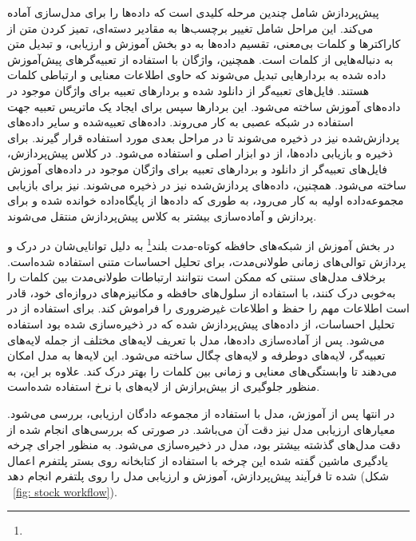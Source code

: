 پیش‌پردازش شامل چندین مرحله کلیدی است که داده‌ها را برای مدل‌سازی آماده می‌کند. این مراحل شامل تغییر برچسب‌ها به مقادیر دسته‌ای، تمیز کردن متن از کاراکترها و کلمات بی‌معنی، تقسیم داده‌ها به دو بخش آموزش و ارزیابی، و تبدیل متن به دنباله‌هایی از کلمات است. همچنین، واژگان با استفاده از تعبیه‌گرهای پیش‌آموزش داده شده  به بردارهایی تبدیل می‌شوند که حاوی اطلاعات معنایی و ارتباطی کلمات هستند. فایل‌های تعبیه‌گر  از  دانلود شده و بردارهای تعبیه برای واژگان موجود در داده‌های آموزش ساخته می‌شود. این بردارها سپس برای ایجاد یک ماتریس تعبیه جهت استفاده در شبکه عصبی به کار می‌روند. داده‌های تعبیه‌شده و سایر داده‌های پردازش‌شده نیز در  ذخیره می‌شوند تا در مراحل بعدی مورد استفاده قرار گیرند. برای ذخیره و بازیابی داده‌ها، از دو ابزار اصلی  و  استفاده می‌شود. در کلاس پیش‌پردازش، فایل‌های تعبیه‌گر  از  دانلود و بردارهای تعبیه برای واژگان موجود در داده‌های آموزش ساخته می‌شود. همچنین، داده‌های پردازش‌شده نیز در  ذخیره می‌شوند.  نیز برای بازیابی مجموعه‌داده اولیه به کار می‌رود، به طوری که داده‌ها از پایگاه‌داده خوانده شده و برای پردازش و آماده‌سازی بیشتر به کلاس پیش‌پردازش منتقل می‌شوند. 

در بخش آموزش از شبکه‌های حافظه کوتاه-مدت بلند\footnote{} به دلیل توانایی‌شان در درک و پردازش توالی‌های زمانی طولانی‌مدت، برای تحلیل احساسات متنی استفاده شده‌است. برخلاف مدل‌های سنتی که ممکن است نتوانند ارتباطات طولانی‌مدت بین کلمات را به‌خوبی درک کنند،  با استفاده از سلول‌های حافظه و مکانیزم‌های دروازه‌ای خود، قادر است اطلاعات مهم را حفظ و اطلاعات غیرضروری را فراموش کند. برای استفاده از  در تحلیل احساسات، از داده‌های پیش‌پردازش شده که در  ذخیره‌سازی شده بود استفاده می‌شود. پس از آماده‌سازی داده‌ها، مدل  با تعریف لایه‌های مختلف از جمله لایه‌های تعبیه‌گر، لایه‌های  دوطرفه و لایه‌های چگال ساخته می‌شود. این لایه‌ها به مدل امکان می‌دهند تا وابستگی‌های معنایی و زمانی بین کلمات را بهتر درک کند. علاوه بر این،‌ به منظور جلوگیری از بیش‌برازش از لایه‌های  با نرخ  استفاده شده‌است.

در انتها پس از آموزش، مدل با استفاده از مجموعه دادگان ارزیابی، بررسی می‌شود. معیارهای ارزیابی مدل نیز دقت آن می‌باشد. در صورتی که بررسی‌های انجام شده از دقت مدل‌های گذشته بیشتر بود، مدل در  ذخیره‌سازی می‌شود. به منظور اجرای چرخه یادگیری ماشین گفته شده این چرخه با استفاده از کتابخانه  روی بستر پلتفرم اعمال شده تا فرآیند پیش‌پردازش،‌ آموزش و ارزیابی مدل را روی پلتفرم انجام دهد (شکل ~\ref{fig: stock workflow}).

